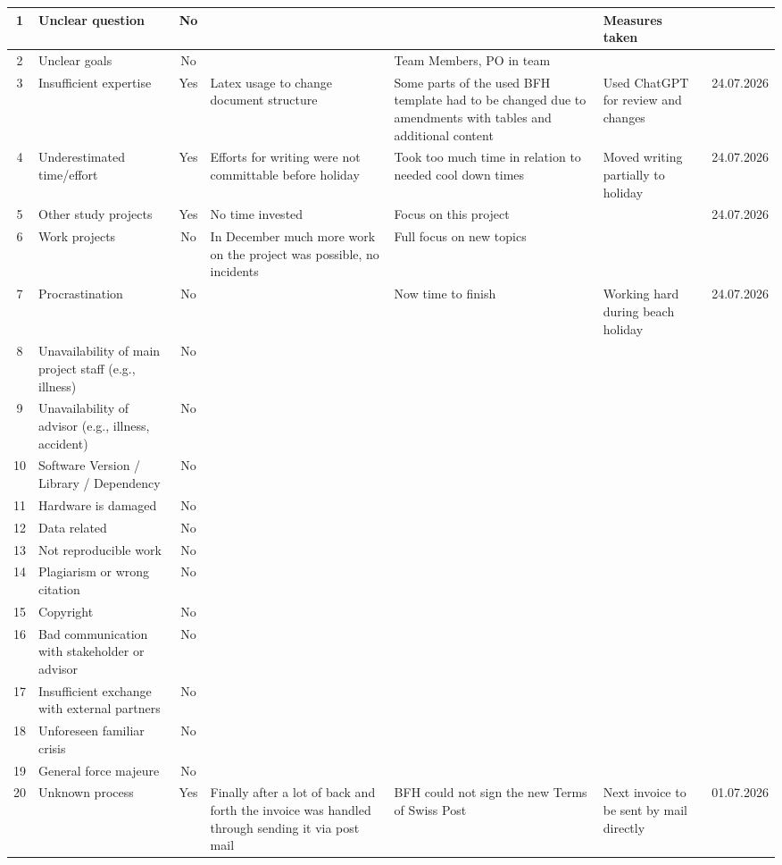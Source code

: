 \begin{landscape}
\begin{longtable}{|c|p{4cm}|c|p{3cm}|p{3cm}|p{3cm}|c|}
1  & Unclear question & No &  &  & Measures taken &  \\ \hline
2  & Unclear goals & No &  & Team Members, PO in team &  &  \\ \hline
3  & Insufficient expertise & Yes & Latex usage to change document structure & Some parts of the used BFH template had to be changed due to amendments with tables and additional content & Used ChatGPT for review and changes & 24.07.2026 \\ \hline
4  & Underestimated time/effort & Yes & Efforts for writing were not committable before holiday & Took too much time in relation to needed cool down times & Moved writing partially to holiday & 24.07.2026 \\ \hline
5  & Other study projects & Yes & No time invested & Focus on this project &  & 24.07.2026 \\ \hline
6  & Work projects & No & In December much more work on the project was possible, no incidents & Full focus on new topics &  &  \\ \hline
7  & Procrastination & No &  & Now time to finish & Working hard during beach holiday & 24.07.2026 \\ \hline
8  & Unavailability of main project staff (e.g., illness) & No &  &  &  &  \\ \hline
9  & Unavailability of advisor (e.g., illness, accident) & No &  &  &  &  \\ \hline
10 & Software Version / Library / Dependency & No &  &  &  &  \\ \hline
11 & Hardware is damaged & No &  &  &  &  \\ \hline
12 & Data related & No &  &  &  &  \\ \hline
13 & Not reproducible work & No &  &  &  &  \\ \hline
14 & Plagiarism or wrong citation & No &  &  &  &  \\ \hline
15 & Copyright & No &  &  &  &  \\ \hline
16 & Bad communication with stakeholder or advisor & No &  &  &  &  \\ \hline
17 & Insufficient exchange with external partners & No &  &  &  &  \\ \hline
18 & Unforeseen familiar crisis & No &  &  &  &  \\ \hline
19 & General force majeure & No &  &  &  &  \\ \hline
20 & Unknown process & Yes & Finally after a lot of back and forth the invoice was handled through sending it via post mail & BFH could not sign the new Terms of Swiss Post & Next invoice to be sent by mail directly & 01.07.2026 \\ \hline

\end{longtable}
\end{landscape}
